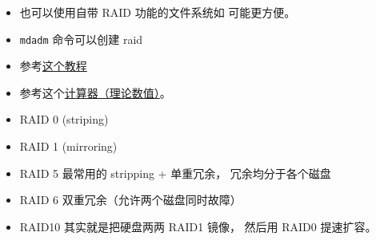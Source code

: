 
\begin{issues}
\issueDraft
\end{issues}

\begin{itemize}
\item 也可以使用自带 RAID 功能的文件系统如  可能更方便。
\item \verb|mdadm| 命令可以创建 raid
\item 参考\href{https://www.digitalocean.com/community/tutorials/how-to-create-raid-arrays-with-mdadm-on-ubuntu-22-04}{这个教程}
\item 参考这个\href{https://www.raid-calculator.com/}{计算器（理论数值）}。
\item RAID 0 (striping)
\item RAID 1 (mirroring)
\item RAID 5 最常用的 stripping + 单重冗余， 冗余均分于各个磁盘
\item RAID 6 双重冗余（允许两个磁盘同时故障）
\item RAID10 其实就是把硬盘两两 RAID1 镜像， 然后用 RAID0 提速扩容。
\end{itemize}
